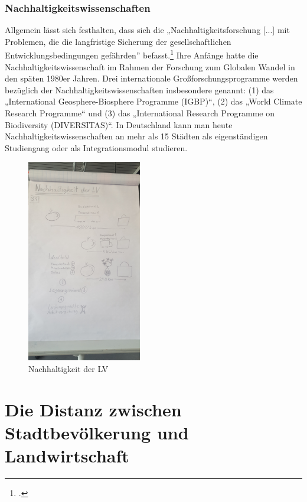 \documentclass{scrartcl}
\begin{document}
\subsubsection{Nachhaltigkeitswissenschaften}
Allgemein lässt sich festhalten, dass sich die „Nachhaltigkeitsforschung [...] mit Problemen, die die langfristige Sicherung der gesellschaftlichen Entwicklungsbedingungen gefährden” befasst.\footcite[S.126]{MichelsenGrundlagenEntwicklung}
Ihre Anfänge hatte die Nachhaltigkeitswissenschaft im Rahmen der Forschung zum Globalen Wandel in den späten 1980er Jahren. Drei internationale Großforschungsprogramme werden bezüglich der Nachhaltigkeitswissenschaften insbesondere genannt: (1) das „International Geosphere-Biosphere Programme (IGBP)“, (2) das „World Climate Research Programme“ und (3) das
„International Research Programme on Biodiversity (DIVERSITAS)“. In Deutschland kann man heute Nachhaltigkeitswissenschaften an mehr als 15 Städten als eigenständigen Studiengang oder als Integrationsmodul studieren.


\begin{figure}[h]
\centering
\includegraphics[width=5cm]{image_folder/skizze1.jpg}
\caption{Nachhaltigkeit der LV}
\label{fig:Skizze_Nachhaltigkeit}
\end{figure}

\FloatBarrier

\section{Die Distanz zwischen Stadtbevölkerung und Landwirtschaft}
\end{document}
